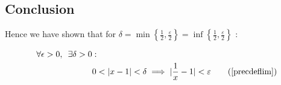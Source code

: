 \documentclass[class=article, crop=false]{standalone}
\begin{document}
\subsection{Conclusion}
Hence we have shown that for $ \delta = \min \left\{ \frac{1}{2}, \frac{\varepsilon}{2} \right\} = \inf \left\{ \frac{1}{2}, \frac{\varepsilon}{2} \right\}$ :

\begin{align}
  \forall \epsilon > 0, \enspace \exists \delta > 0& : \notag \\
  &0 < \lvert x -1 \rvert < \delta \implies \lvert \frac{1}{x}-1 \rvert < \varepsilon \tag{\ref{precdeflim}}
\end{align}
\end{document}
